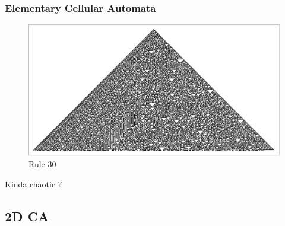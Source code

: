 \documentclass{beamer}
\begin{document}

\begin{frame}
    \frametitle{Elementary Cellular Automata}
    \begin{figure}
        \includegraphics[scale=0.39]{rule30.pdf}
        \caption{Rule 30}
    \end{figure}
    Kinda chaotic ?
\end{frame}
\subsection{2D CA}


\end{document}
